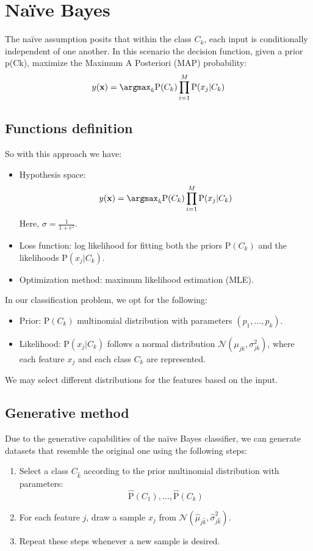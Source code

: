 \section{Naïve Bayes}

The naïve assumption posits that within the class $C_k$, each input is conditionally independent of one another.
In this scenario the decision function, given a prior p(Ck), maximize the Maximum A Posteriori (MAP) probability:
\[y(\textbf{x})=\argmax_{k}\text{P}(C_k)\prod_{i=1}^{M}\text{P}(x_j|C_k)\]

\subsection{Functions definition}
So with this approach we have: 
\begin{itemize}
    \item Hypothesis space: 
    \[y(\textbf{x})=\argmax_{k}\text{P}(C_k)\prod_{i=1}^{M}\text{P}(x_j|C_k)\]
    Here, $\sigma=\frac{1}{1+e^{z}}$. 
    \item Loss function: log likelihood for fitting both the priors $\text{P}(C_k)$ and the likelihoods $\text{P}(x_j |C_k)$.
    \item Optimization method: maximum likelihood estimation (MLE).
\end{itemize}
In our classification problem, we opt for the following:
\begin{itemize}
    \item Prior: $\text{P}(C_k)$ multinomial distribution with parameters $(p_1, \dots , p_k)$. 
    \item Likelihood: $\text{P}(x_j|C_k)$ follows a normal distribution $\mathcal{N}(\mu_{jk},\sigma_{jk}^2)$, where each feature $x_j$ and each class $C_k$ are represented.
\end{itemize}
We may select different distributions for the features based on the input.

\subsection{Generative method}
Due to the generative capabilities of the naïve Bayes classifier, we can generate datasets that resemble the original one using the following steps:
\begin{enumerate}
    \item Select a class $C_{\hat{k}}$ according to the prior multinomial distribution with parameters: 
        \[\hat{\text{P}}(C_1),\dots,\hat{\text{P}}(C_k)\]
    \item For each feature $j$, draw a sample $x_j$ from $\mathcal{N}(\hat{\mu}_{j\hat{k}}, \hat{\sigma}_{j\hat{k}}^2)$. 
    \item Repeat these steps whenever a new sample is desired.
\end{enumerate}

